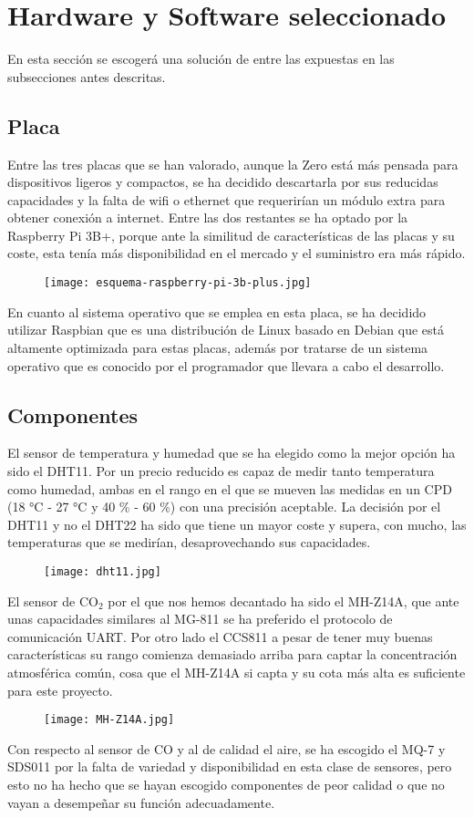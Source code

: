 \section{Hardware y Software seleccionado}\label{sec:hardwareSoftware}
En esta sección se escogerá una solución de entre las expuestas en las subsecciones antes descritas.

\subsection{Placa}
Entre las tres placas que se han valorado, aunque la Zero está más pensada para dispositivos ligeros y compactos, se ha decidido descartarla por sus reducidas capacidades y la falta de wifi o ethernet que requerirían un módulo extra para obtener conexión a internet. Entre las dos restantes se ha optado por la Raspberry Pi 3B+, porque ante la similitud de características de las placas y su coste, esta tenía más disponibilidad en el mercado y el suministro era más rápido. 
\begin{figure}[H]
	{\texttt{[image: esquema-raspberry-pi-3b-plus.jpg]}}
\end{figure}
En cuanto al sistema operativo que se emplea en esta placa, se ha decidido utilizar Raspbian que es una distribución de Linux basado en Debian que está altamente optimizada para estas placas, además por tratarse de un sistema operativo que es conocido por el programador que llevara a cabo el desarrollo.

\subsection{Componentes}
El sensor de temperatura y humedad que se ha elegido como la mejor opción ha sido el DHT11. Por un precio reducido es capaz de medir tanto temperatura como humedad, ambas en el rango en el que se mueven las medidas en un CPD (18 °C - 27 °C y  40 \% - 60 \%) con una precisión aceptable. La decisión por el DHT11 y no el DHT22 ha sido que tiene un mayor coste y supera, con mucho, las temperaturas que se medirían, desaprovechando sus capacidades.
\begin{figure}[H]
	{\texttt{[image: dht11.jpg]}}
\end{figure}
El sensor de CO$_2$ por el que nos hemos decantado ha sido el MH-Z14A, que ante unas capacidades similares al MG-811 se ha preferido el protocolo de comunicación UART. Por otro lado el CCS811 a pesar de tener muy buenas características su rango comienza demasiado arriba para captar la concentración atmosférica común, cosa que el MH-Z14A si capta y su cota más alta es suficiente para este proyecto.
\begin{figure}[H]
	{\texttt{[image: MH-Z14A.jpg]}}
\end{figure}
Con respecto al sensor de CO y al de calidad el aire, se ha escogido el MQ-7 y SDS011 por la falta de variedad y disponibilidad en esta clase de sensores, pero esto no ha hecho que se hayan escogido componentes de peor calidad o que no vayan a desempeñar su función adecuadamente.

